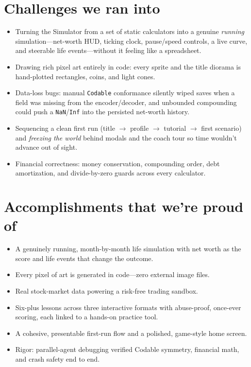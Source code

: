 \documentclass[11pt]{article}
\begin{document}
\section*{Challenges we ran into}
\begin{itemize}
  \item Turning the Simulator from a set of static calculators into a genuine
  \emph{running} simulation---net-worth HUD, ticking clock, pause/speed controls, a live
  curve, and steerable life events---without it feeling like a spreadsheet.
  \item Drawing rich pixel art entirely in code: every sprite and the title diorama is
  hand-plotted rectangles, coins, and light cones.
  \item Data-loss bugs: manual \texttt{Codable} conformance silently wiped saves when a
  field was missing from the encoder/decoder, and unbounded compounding could push a
  \texttt{NaN}/\texttt{Inf} into the persisted net-worth history.
  \item Sequencing a clean first run (title $\rightarrow$ profile $\rightarrow$ tutorial
  $\rightarrow$ first scenario) and \emph{freezing the world} behind modals and the coach
  tour so time wouldn't advance out of sight.
  \item Financial correctness: money conservation, compounding order, debt amortization,
  and divide-by-zero guards across every calculator.
\end{itemize}

\section*{Accomplishments that we're proud of}
\begin{itemize}
  \item A genuinely running, month-by-month life simulation with net worth as the score
  and life events that change the outcome.
  \item Every pixel of art is generated in code---zero external image files.
  \item Real stock-market data powering a risk-free trading sandbox.
  \item Six-plus lessons across three interactive formats with abuse-proof, once-ever
  scoring, each linked to a hands-on practice tool.
  \item A cohesive, presentable first-run flow and a polished, game-style home screen.
  \item Rigor: parallel-agent debugging verified Codable symmetry, financial math, and
  crash safety end to end.
\end{itemize}
\end{document}
